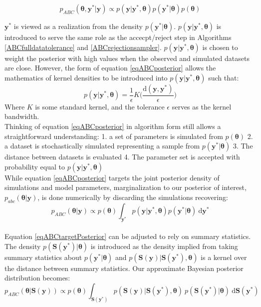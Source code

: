 \begin{equation}
p_{ABC}(\bm{\theta},\bm{y^*}|\bm{y}) \propto p(\bm{y}|\bm{y^*},\bm{\theta}) p(\bm{y^*}|\bm{\theta}) p(\bm{\theta})
\label{eqABCposterior}
\end{equation}

$\bm{y^*}$ is viewed as a realization from the density $p(\bm{y^*}|\bm{\theta})$. $p(\bm{y}|\bm{y^*},\bm{\theta})$ is introduced to serve the same role as the accecpt/reject step in Algorithms \ref{ABCfulldatatolerance} and \ref{ABCrejectionsampler}. $p(\bm{y}|\bm{y^*},\bm{\theta})$ is chosen to weight the posterior with high values when the observed and simulated datasets are close. However, the form of equation \ref{eqABCposterior} allows the mathematics of kernel densities to be introduced into $p(\bm{y}|\bm{y^*},\bm{\theta})$ such that:
\begin{equation}
p(\bm{y}|\bm{y^*},\bm{\theta}) = \frac{1}{\epsilon} K \Big(\frac{\text{d}(\bm{y},\bm{y^*})}{\epsilon}\Big)
\label{generic-weighting-kernel}
\end{equation}
Where $K$ is some standard kernel, and the tolerance $\epsilon$ serves as the kernel bandwidth. \\

Thinking of equation \ref{eqABCposterior} in algorithm form still allows a straightforward understanding: 1. a set of parameters is simulated from $p(\bm{\theta})$ 2. a dataset is stochastically simulated representing a sample from $p(\bm{y^*}|\bm{\theta})$ 3. The distance between datasets is evaluated 4. The parameter set is accepted with probability equal to $p(\bm{y}|\bm{y^*},\bm{\theta})$\\

While equation \ref{eqABCposterior} targets the joint posterior density of simulations and model parameters, marginalization to our posterior of interest, $p_{abc}(\bm{\theta}|\bm{y})$, is done numerically by discarding the simulations recovering:
\begin{equation}
p_{ABC}(\bm{\theta}|\bm{y}) \propto p(\bm{\theta}) \int_{\bm{y^*}} p(\bm{y}|\bm{y^*},\bm{\theta}) p(\bm{y^*}|\bm{\theta})\ \text{d}\bm{y^*}
\label{eqABCtargetPosterior}
\end{equation}\\

Equation \ref{eqABCtargetPosterior} can be adjusted to rely on summary statistics. The density $p(\bm{S}(\bm{y^*})|\bm{\theta})$ is introduced as the density implied from taking summary statistics about $p(\bm{y^*}|\bm{\theta})$ and $p(\bm{S}(\bm{y})|\bm{S}(\bm{y^*}),\bm{\theta})$ is a kernel over the distance between summary statistics. Our approximate Bayesian posterior distribution becomes:
\begin{equation}
p_{ABC}(\bm{\theta}|\bm{S}(\bm{y})) \propto p(\bm{\theta}) \int_{\bm{S}(\bm{y^*})} p(\bm{S}(\bm{y})|\bm{S}(\bm{y^*}),\bm{\theta})\  p(\bm{S}(\bm{y^*})|\bm{\theta})\ \text{d}\bm{S}(\bm{y^*})
\label{summary-stat-abc-posterior}
\end{equation}

